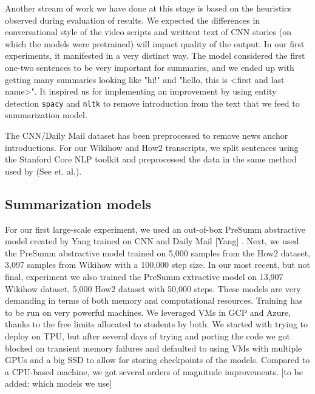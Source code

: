\documentclass{article}
\begin{document}
Another stream of work we have done at this stage is based on the heuristics observed during evaluation of results. We expected the differences in conversational style of the video scripts and writtent text of CNN stories (on which the models were pretrained) will impact quality of the output. In our first experiments, it manifested in a very distinct way. The model considered the first one-two sentences to be very important for summaries, and we ended up with getting many summaries looking like "hi!" and "hello, this is <first and last name>". It inspired us for implementing an improvement by using entity detection   \verb+spacy+ and \verb+nltk+ to remove introduction from the text that we feed to summarization model.  

The CNN/Daily Mail dataset has been preprocessed to remove news anchor introductions. For our Wikihow and How2 transcripts, we  split sentences using the Stanford Core NLP toolkit and preprocessed the data in the same method used by (See et. al.).  


\subsection{Summarization models}
For our first large-scale experiment, we used an out-of-box PreSumm abstractive model  created by Yang trained on CNN and Daily Mail [Yang] .  Next, we used the PreSumm abstractive model  trained on 5,000 samples from the How2 dataset, 3,097 samples from Wikihow with a 100,000 step size. In our most recent, but not final,  experiment we also trained the PreSumm extractive model on 13,907 Wikihow dataset, 5,000 How2 dataset with 50,000 steps.
These models are very demanding in terms of both memory and computational resources. Training has to be run on very powerful machines. We leveraged VMs in GCP and Azure, thanks to the free limits allocated to students by both. We started with trying to deploy on TPU, but after several days of trying and porting the code we got blocked on transient memory failures and defaulted to using VMs with multiple GPUs and a big SSD to allow for storing checkpoints of the models. Compared to a CPU-based machine, we got several orders of magnitude improvements. [to be added: which models we use]
\end{document}
